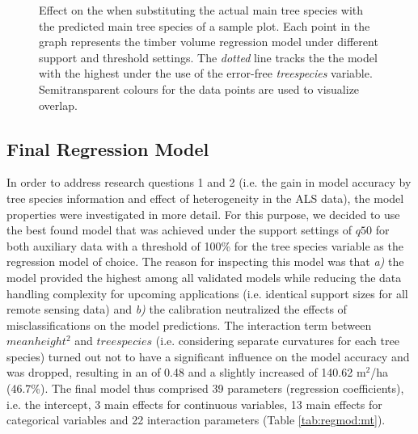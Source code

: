 \begin{figure}[h]
	\centering
	\caption{Effect on the \adjrsq{} when substituting the actual main tree species with the predicted  main tree species of a sample plot. Each point in the graph represents the timber volume regression model under different support and threshold settings. The \textit{dotted} line tracks the the model with the highest \adjrsq{} under the use of the error-free \textit{treespecies} variable. Semitransparent colours for the data points are used to visualize overlap.}
	\label{fig:supp_r2_calnocal}
\end{figure}


\subsection{Final Regression Model}
\label{sec:regmod_final}

In order to address research questions 1 and 2 (i.e. the gain in model accuracy by tree species information and effect of heterogeneity in the ALS data), the model properties were investigated in more detail. For this purpose, we decided to use the best found model that was achieved under the support settings of $q50$ for both auxiliary data with a threshold of 100\% for the tree species variable as the regression model of choice. The reason for inspecting this model was that \textit{a)} the model provided the highest \adjrsq{} among all validated models while reducing the data handling complexity for upcoming applications (i.e. identical support sizes for all remote sensing data) and \textit{b)} the calibration neutralized the effects of misclassifications on the model predictions. The interaction term between $meanheight^2$ and $treespecies$ (i.e. considering separate curvatures for each tree species) turned out not to have a significant influence on the model accuracy and was dropped, resulting in an \adjrsq{} of 0.48 and a slightly increased \rmsecv{} of 140.62 m$^2$/ha (46.7\%). The final model thus comprised 39 parameters (regression coefficients), i.e. the intercept, 3 main effects for continuous variables, 13 main effects for categorical variables and 22 interaction parameters (Table \ref{tab:regmod:mt}).\par

